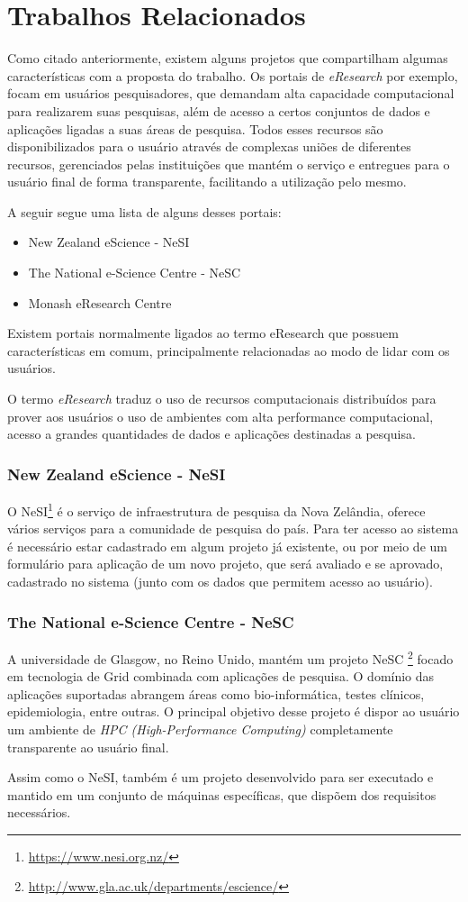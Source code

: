 \documentclass[tg]{mdtufsm}
\begin{document}
\section{Trabalhos Relacionados}
Como citado anteriormente, existem alguns projetos que compartilham algumas características com a proposta do trabalho.
Os portais de \emph{eResearch} por exemplo, focam em usuários pesquisadores, que demandam alta capacidade computacional para realizarem suas pesquisas, além de acesso a certos conjuntos de dados e aplicações ligadas a suas áreas de pesquisa. Todos esses recursos são disponibilizados para o usuário através de complexas uniões de diferentes recursos, gerenciados pelas instituições que mantém o serviço e entregues para o usuário final de forma transparente, facilitando a utilização pelo mesmo.

A seguir segue uma lista de alguns desses portais:
\begin{itemize}
	\item New Zealand eScience - NeSI \cite{nesi}
	\item The National e-Science Centre - NeSC \cite{nesc}
	\item Monash eResearch Centre \cite{monash}
\end{itemize}
\iffalse

Existem portais normalmente ligados ao termo eResearch que possuem características em comum, principalmente relacionadas ao modo de lidar com os usuários.

O termo \emph{eResearch} traduz o uso de recursos computacionais distribuídos para prover aos usuários o uso de ambientes com alta performance computacional, acesso a grandes quantidades de dados e aplicações destinadas a pesquisa.
\subsubsection{New Zealand eScience - NeSI}
O NeSI\footnote{\url{https://www.nesi.org.nz/}} é o serviço de infraestrutura de pesquisa da Nova Zelândia, oferece vários serviços para a comunidade de pesquisa do país. Para ter acesso ao sistema é necessário estar cadastrado em algum projeto já existente, ou por meio de um formulário para aplicação de um novo projeto, que será avaliado e se aprovado, cadastrado no sistema (junto com os dados que permitem acesso ao usuário).
\subsubsection {The National e-Science Centre - NeSC}
A universidade de Glasgow, no Reino Unido, mantém um projeto NeSC \footnote{\url{http://www.gla.ac.uk/departments/escience/}} focado em tecnologia de Grid combinada com aplicações de pesquisa. O domínio das aplicações suportadas abrangem áreas como bio-informática, testes clínicos, epidemiologia, entre outras. O principal objetivo desse projeto é dispor ao usuário um ambiente de \emph{HPC (High-Performance Computing)} completamente transparente ao usuário final. 
\item Assim como o NeSI, também é um projeto desenvolvido para ser executado e mantido em um conjunto de máquinas específicas, que dispõem dos requisitos necessários.
\end{document}
